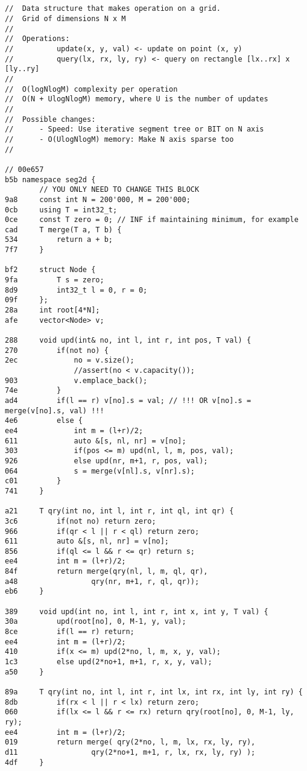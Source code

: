 \documentclass[11pt, a4paper, twoside]{article}
\begin{document}
\subsection{}
\begin{lstlisting}
//  Data structure that makes operation on a grid.
//  Grid of dimensions N x M
//
//  Operations:
//          update(x, y, val) <- update on point (x, y)
//          query(lx, rx, ly, ry) <- query on rectangle [lx..rx] x [ly..ry]
//
//  O(logNlogM) complexity per operation
//  O(N + UlogNlogM) memory, where U is the number of updates
//
//  Possible changes:
//      - Speed: Use iterative segment tree or BIT on N axis
//      - O(UlogNlogM) memory: Make N axis sparse too
//

// 00e657
b5b namespace seg2d {
    	// YOU ONLY NEED TO CHANGE THIS BLOCK
9a8 	const int N = 200'000, M = 200'000;
0cb 	using T = int32_t;
0ce 	const T zero = 0; // INF if maintaining minimum, for example
cad 	T merge(T a, T b) {
534 		return a + b;
7f7 	}
    
bf2 	struct Node {
9fa 		T s = zero;
8d9 		int32_t l = 0, r = 0;
09f 	};
28a 	int root[4*N];
afe 	vector<Node> v;
    
288 	void upd(int& no, int l, int r, int pos, T val) {
270 		if(not no) {
2ec 			no = v.size();
    			//assert(no < v.capacity());
903 			v.emplace_back();
74e 		}
ad4 		if(l == r) v[no].s = val; // !!! OR v[no].s = merge(v[no].s, val) !!!
4e6 		else {
ee4 			int m = (l+r)/2;
611 			auto &[s, nl, nr] = v[no];
303 			if(pos <= m) upd(nl, l, m, pos, val);
926 			else upd(nr, m+1, r, pos, val);
064 			s = merge(v[nl].s, v[nr].s);
c01 		}
741 	}
    
a21 	T qry(int no, int l, int r, int ql, int qr) {
3c6 		if(not no) return zero;
966 		if(qr < l || r < ql) return zero;
611 		auto &[s, nl, nr] = v[no];
856 		if(ql <= l && r <= qr) return s;
ee4 		int m = (l+r)/2;
84f 		return merge(qry(nl, l, m, ql, qr),
a48 				qry(nr, m+1, r, ql, qr));
eb6 	}
    
389 	void upd(int no, int l, int r, int x, int y, T val) {
30a 		upd(root[no], 0, M-1, y, val);
8ce 		if(l == r) return;
ee4 		int m = (l+r)/2;
410 		if(x <= m) upd(2*no, l, m, x, y, val);
1c3 		else upd(2*no+1, m+1, r, x, y, val);
a50 	}
    
89a 	T qry(int no, int l, int r, int lx, int rx, int ly, int ry) {
8db 		if(rx < l || r < lx) return zero;
060 		if(lx <= l && r <= rx) return qry(root[no], 0, M-1, ly, ry);
ee4 		int m = (l+r)/2;
019 		return merge( qry(2*no, l, m, lx, rx, ly, ry),
d11 				qry(2*no+1, m+1, r, lx, rx, ly, ry) );
4df 	}
    

\end{lstlisting}
\end{document}
